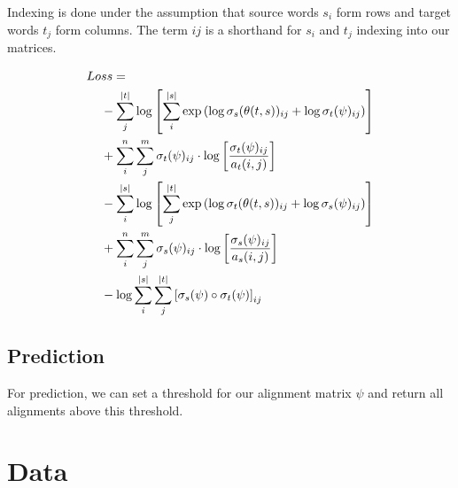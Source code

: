\documentclass[twoside,twocolumn]{article}
\begin{document}
Indexing is done under the assumption that source words $s_i$ form rows
and target words $t_j$ form columns. The term $ij$ is a shorthand
for $s_i$ and $t_j$ indexing into our matrices.

\begin{equation}
  \centering
\begin{split}
  Lo&ss = \\
  &- \sum_j^{|t|} \log \left[
      \sum_i^{|s|} \exp \left(
        \log \sigma_s(\theta(t, s))_{ij} + \log \sigma_t(\psi)_{ij} \right)
    \right] \\
  &+ \sum_i^n \sum_j^m \sigma_t(\psi)_{ij} \cdot \log \left[
    \frac{\sigma_t(\psi)_{ij}}{a_t(i, j)} \right] \\
  &- \sum_i^{|s|} \log \left[ \sum_j^{|t|}
      \exp \left(
        \log \sigma_t(\theta(t, s))_{ij} + \log \sigma_s(\psi)_{ij}
      \right)
    \right] \\
  &+ \sum_i^n \sum_j^m \sigma_s(\psi)_{ij} \cdot \log \left[
    \frac{\sigma_s(\psi)_{ij}}{a_s(i, j)} \right] \\
  &- \log \sum_i^{|s|} \sum_j^{|t|} \left[
    \sigma_s(\psi) \circ \sigma_t(\psi) \right]_{ij} \\
\end{split}
\end{equation}



\subsection{Prediction}

For prediction, we can set a threshold for our alignment matrix $\psi$ and
return all alignments above this threshold.


\section{Data}

\end{document}
